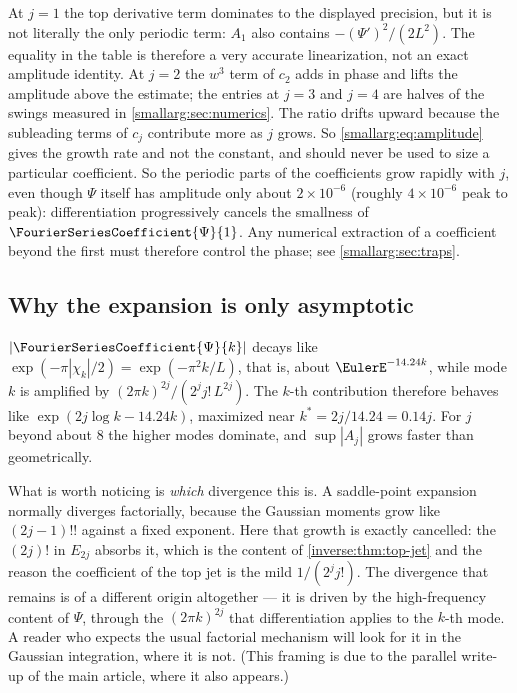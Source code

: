 \documentclass[11pt,oneside]{article}
\theoremstyle{definition}
\theoremstyle{remark}
\begin{document}
At $j=1$ the top derivative term dominates to the displayed precision, but it is not literally the only periodic term: $A_1$ also contains $-(\Psi')^2/(2L^2)$.  The equality in the table is therefore a very accurate linearization, not an exact amplitude identity.  At
$j=2$ the $w^3$ term of $c_2$ adds in phase and lifts the amplitude above
the estimate; the entries at $j=3$ and $j=4$ are halves of the swings
measured in \cref{smallarg:sec:numerics}.  The ratio drifts upward because the
subleading terms of $c_j$ contribute more as $j$ grows.  So
\cref{smallarg:eq:amplitude} gives the growth rate and not the constant, and should
never be used to size a particular coefficient.  So the periodic parts of
the coefficients grow rapidly with $j$, even though \(\Psi\) itself has
amplitude only about \(2\times10^{-6}\) (roughly \(4\times10^{-6}\) peak to
peak): differentiation progressively cancels the smallness of
$\FourierSeriesCoefficient{\Psi}{1}$.  Any numerical extraction of a coefficient beyond
the first must
therefore control the phase; see \cref{smallarg:sec:traps}.

\subsection{Why the expansion is only asymptotic}

$|\FourierSeriesCoefficient{\Psi}{k}|$ decays like
$\exp(-\pi|\chi_k|/2)=\exp(-\pi^2k/L)$, that is,
about $\EulerE^{-14.24k}$, while mode $k$ is amplified by
$(2\pi k)^{2j}/(2^jj!\,L^{2j})$.  The $k$-th contribution therefore behaves like
$\exp(2j\log k-14.24k)$, maximized near $k^\ast=2j/14.24=0.14j$.  For $j$ beyond
about $8$ the higher modes dominate, and $\sup|A_j|$ grows faster than
geometrically.

What is worth noticing is \emph{which} divergence this is.  A saddle-point
expansion normally diverges factorially, because the Gaussian moments grow
like $(2j-1)!!$ against a fixed exponent.  Here that growth is exactly
cancelled: the $(2j)!$ in $E_{2j}$ absorbs it, which is the content of
\cref{inverse:thm:top-jet} and the reason the coefficient of the top jet is the mild
$1/(2^jj!)$.  The divergence that remains is of a different origin
altogether --- it is driven by the high-frequency content of $\Psi$, through
the $(2\pi k)^{2j}$ that differentiation applies to the $k$-th mode.  A
reader who expects the usual factorial mechanism will look for it in the
Gaussian integration, where it is not.  (This framing is due to the parallel
write-up of the main article, where it also appears.)
\end{document}
